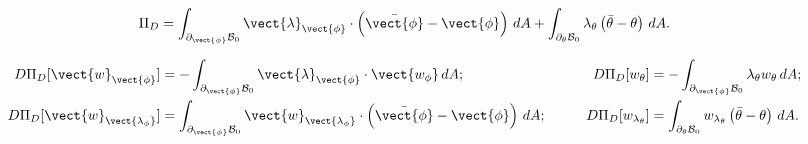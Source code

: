 \begin{equation}
\Pi_{D}  =  \int_{\partial_{\vect{\phi}}\mathcal{B}_0}\vect{\lambda}_{\vect{\phi}}\cdot\left(\bar{\vect{\phi}}-\vect{\phi}\right)\,dA + 
%
\int_{\partial_{\theta}\mathcal{B}_0}{\lambda}_{\theta}\left(\bar{\theta}-\theta\right)\,dA.
\end{equation}

\begin{equation}
\begin{aligned}	
D\Pi_D[\vect{w}_{\vect{\phi}}]&=-\int_{\partial_{\vect{\phi}}\mathcal{B}_0}\vect{\lambda}_{\vect{\phi}}\cdot\vect{w_{\phi}}\,dA;&\qquad
%
D\Pi_D[{w}_{\theta}]&=-\int_{\partial_{\vect{\phi}}\mathcal{B}_0}{\lambda}_{{\theta}}w_{\theta}\,dA;\\
%
%
D\Pi_D[\vect{w}_{\vect{\lambda_{\phi}}}]&=\int_{\partial_{\vect{\phi}}\mathcal{B}_0}\vect{w}_{\vect{\lambda_{\phi}}}\cdot\left(\bar{\vect{\phi}}-\vect{\phi}\right)\,dA;&\qquad
%
D\Pi_D[{w}_{\lambda_{\theta}}]&=\int_{\partial_{\theta}\mathcal{B}_0}{w}_{\lambda_{\theta}}\left(\bar{\theta}-\theta\right)\,dA.
%
\end{aligned}
\end{equation}

